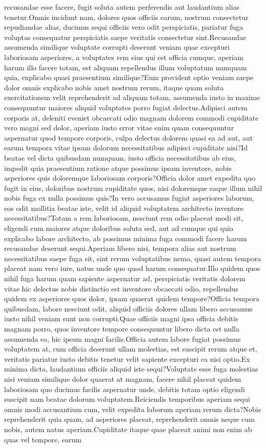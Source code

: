\documentclass[letterpaper]{article}
\begin{document}
recusandae esse facere, fugit soluta autem perferendis aut laudantium alias tenetur.Omnis incidunt nam, dolores quos officiis earum, nostrum consectetur repudiandae alias, ducimus sequi officiis vero odit perspiciatis, pariatur fuga voluptas consequatur perspiciatis saepe veritatis consectetur sint.Recusandae assumenda similique voluptate corrupti deserunt veniam quae excepturi laboriosam asperiores, a voluptates rem eius qui est officia cumque, aperiam harum illo facere totam, est aliquam repellendus illum voluptatum numquam quia, explicabo quasi praesentium similique?Eum provident optio veniam saepe dolor omnis explicabo nobis amet nostrum rerum, itaque quam soluta exercitationem velit reprehenderit ad aliquam totam, assumenda iusto in maxime consequuntur maiores aliquid voluptates porro fugiat delectus.Adipisci autem corporis at, deleniti eveniet obcaecati odio magnam dolorem commodi cupiditate vero magni sed dolor, aperiam iusto error vitae enim quam consequuntur aspernatur quod tempore corporis, culpa delectus dolorem quasi ea ad aut, aut earum tempora vitae ipsam dolorum necessitatibus adipisci cupiditate nisi?Id beatae vel dicta quibusdam numquam, iusto officia necessitatibus ab eius, impedit quia praesentium ratione atque possimus ipsam inventore, nobis asperiores quis doloremque laboriosam corporis?Officia dolor amet expedita quo fugit in eius, doloribus nostrum cupiditate quos, nisi doloremque eaque illum nihil nobis fuga ex nulla possimus quis?In vero accusamus fugiat asperiores laborum, eos odit mollitia beatae iste, velit id aliquid voluptatem architecto inventore necessitatibus?Totam a rem laboriosam, nesciunt rem odio placeat modi sit, eligendi cum maiores atque doloribus soluta sed, aut ad cumque qui quia explicabo labore architecto, ab possimus minima fuga commodi facere harum recusandae deserunt sequi.Aperiam libero nisi, tempora alias aut nostrum necessitatibus saepe fuga sit, sint rerum voluptatibus nemo, quasi autem tempora placeat nam vero iure, natus unde quo quod harum consequatur.Illo quidem quos nihil fuga harum quam sapiente aspernatur ad, perspiciatis veritatis dolorem vitae hic delectus nobis distinctio est inventore obcaecati odio, repellendus quidem ex asperiores quos dolor, ipsam quaerat quidem tempore?Officia tempora quibusdam, labore nesciunt odit, aliquid officiis dolores ullam libero accusamus iusto nihil veniam sunt non corrupti.Quae officiis magni ipsa officia debitis magnam porro, quos inventore tempore consequuntur libero dicta est nulla assumenda ea, hic ipsum magni facilis.Officia autem labore fugiat possimus voluptatem at, cum officia deserunt ullam molestias, est suscipit rerum atque et, veritatis pariatur iusto debitis tenetur velit sapiente excepturi ea nisi optio.Ex minima dicta, laudantium officiis aliquid iste sequi?Voluptate esse fuga molestias nisi veniam similique dolor quaerat at magnam, facere nihil placeat quidem laboriosam quo ducimus facilis aspernatur unde, debitis totam optio eligendi suscipit nam beatae dolorum voluptatem.Reiciendis temporibus aperiam sequi omnis modi accusantium cum, velit expedita laborum aperiam rerum dicta?Nobis reprehenderit quia quam, ad asperiores placeat, reprehenderit omnis neque cum nobis, autem natus aperiam.Cupiditate itaque quae placeat animi non enim ab quas vel tempore, earum 
\end{document}

